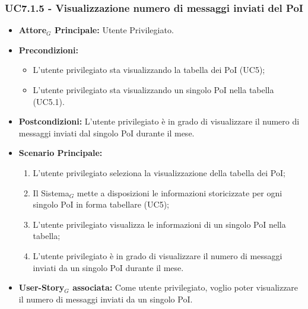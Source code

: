 \documentclass[10pt]{article}
\begin{document}
\begin{justify}
\subsubsection{\textbf{UC7.1.5 - Visualizzazione numero di messaggi inviati del PoI}}
\label{UC7.1.5}
\begin{itemize}
    \item \textbf{Attore$_G$ Principale:} Utente Privilegiato.
    \item \textbf{Precondizioni:} 
        \begin{itemize}
          \item L'utente privilegiato sta visualizzando la tabella dei PoI (UC5);
            \item L'utente privilegiato sta visualizzando un singolo PoI nella tabella (UC5.1).
        \end{itemize}
      \item \textbf{Postcondizioni:} L'utente privilegiato è in grado di visualizzare il numero di messaggi inviati dal singolo PoI durante il mese.
    \item \textbf{Scenario Principale:} 
        \begin{enumerate}
        \item L'utente privilegiato seleziona la visualizzazione della tabella dei PoI;
          \item Il Sistema$_G$ mette a disposizioni le informazioni storicizzate per ogni singolo PoI in forma tabellare (UC5);
          \item L'utente privilegiato visualizza le informazioni di un singolo PoI nella tabella;
            \item L'utente privilegiato è in grado di visualizzare il numero di messaggi inviati da un singolo PoI durante il mese.
        \end{enumerate}
    \item \textbf{User-Story$_G$ associata:} Come utente privilegiato, voglio poter visualizzare il numero di messaggi inviati da un singolo PoI.
\end{itemize}


\end{justify}
\end{document}
